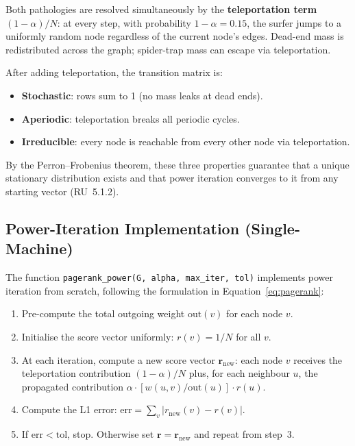 \documentclass[12pt, a4paper]{article}
\begin{document}
Both pathologies are resolved simultaneously by the \textbf{teleportation term} $(1-\alpha)/N$: at every step, with probability $1-\alpha = 0.15$, the surfer jumps to a uniformly random node regardless of the current node's edges. Dead-end mass is redistributed across the graph; spider-trap mass can escape via teleportation.

After adding teleportation, the transition matrix is:
\begin{itemize}
  \item \textbf{Stochastic}: rows sum to 1 (no mass leaks at dead ends).
  \item \textbf{Aperiodic}: teleportation breaks all periodic cycles.
  \item \textbf{Irreducible}: every node is reachable from every other node via teleportation.
\end{itemize}

By the Perron--Frobenius theorem, these three properties guarantee that a unique stationary distribution exists and that power iteration converges to it from any starting vector (RU~5.1.2).

\subsection{Power-Iteration Implementation (Single-Machine)}
\label{subsec:power-iteration}

The function \texttt{pagerank\_power(G, alpha, max\_iter, tol)} implements power iteration from scratch, following the formulation in Equation~\ref{eq:pagerank}:

\begin{enumerate}
  \item Pre-compute the total outgoing weight $\mathrm{out}(v)$ for each node $v$.
  \item Initialise the score vector uniformly: $r(v) = 1/N$ for all $v$.
  \item At each iteration, compute a new score vector $\mathbf{r}_{\mathrm{new}}$: each node $v$ receives the teleportation contribution $(1-\alpha)/N$ plus, for each neighbour $u$, the propagated contribution $\alpha \cdot [w(u,v)/\mathrm{out}(u)] \cdot r(u)$.
  \item Compute the L1 error: $\mathrm{err} = \sum_v |r_{\mathrm{new}}(v) - r(v)|$.
  \item If $\mathrm{err} < \mathrm{tol}$, stop. Otherwise set $\mathbf{r} = \mathbf{r}_{\mathrm{new}}$ and repeat from step~3.
\end{enumerate}
\end{document}
